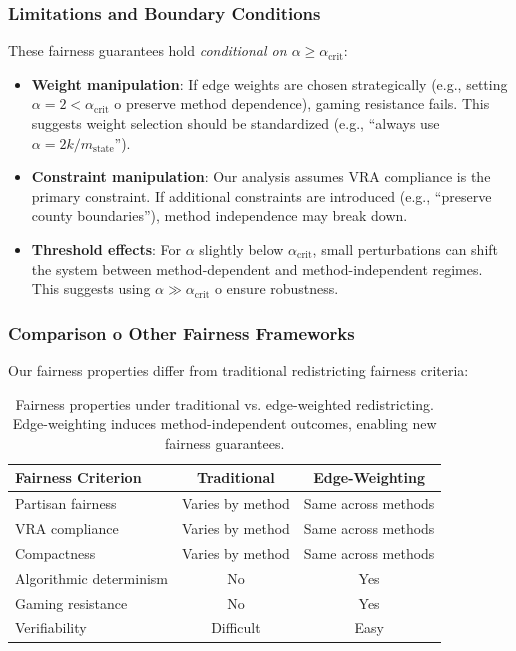 \subsubsection{Limitations and Boundary Conditions}

These fairness guarantees hold \textit{conditional on $\alpha \geq \alpha_{\text{crit}}$}:

\begin{itemize}
    \item \textbf{Weight manipulation}: If edge weights are chosen strategically (e.g., setting $\alpha = 2 < \alpha_{\text{crit}}$ 	o preserve method dependence), gaming resistance fails. This suggests weight selection should be standardized (e.g., ``always use $\alpha = 2k / m_{\text{state}}$'').

    \item \textbf{Constraint manipulation}: Our analysis assumes VRA compliance is the primary constraint. If additional constraints are introduced (e.g., ``preserve county boundaries''), method independence may break down.

    \item \textbf{Threshold effects}: For $\alpha$ slightly below $\alpha_{\text{crit}}$, small perturbations can shift the system between method-dependent and method-independent regimes. This suggests using $\alpha \gg \alpha_{\text{crit}}$ 	o ensure robustness.
\end{itemize}

\subsubsection{Comparison 	o Other Fairness Frameworks}

Our fairness properties differ from traditional redistricting fairness criteria:

\begin{table}[h]
\centering
\begin{tabular}{lcc}
\toprule
\textbf{Fairness Criterion} & \textbf{Traditional} & \textbf{Edge-Weighting} \\
\midrule
Partisan fairness & Varies by method & Same across methods \\
VRA compliance & Varies by method & Same across methods \\
Compactness & Varies by method & Same across methods \\
Algorithmic determinism & No & Yes \\
Gaming resistance & No & Yes \\
Verifiability & Difficult & Easy \\
\bottomrule
\end{tabular}
\caption{Fairness properties under traditional vs. edge-weighted redistricting. Edge-weighting induces method-independent outcomes, enabling new fairness guarantees.}
\label{tab:fairness-comparison}
\end{table}

